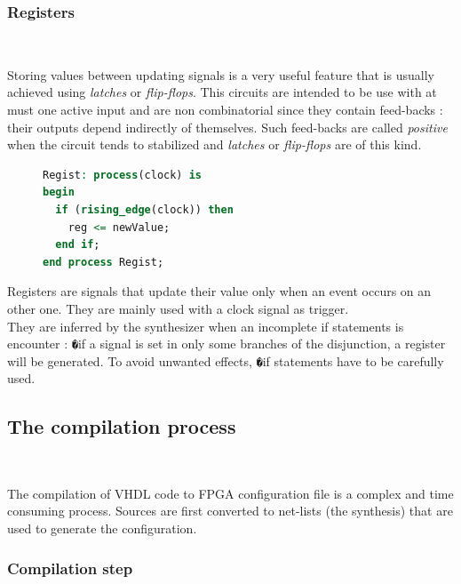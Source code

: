 \documentclass[10pt,a4paper]{article}
\newcommand{\code}{\texttt}
\renewcommand{\indent}{~\\\vspace{-.8cm}}
\begin{document}
\subsubsection{Registers}\indent


Storing values between updating signals is a very useful feature that is usually achieved using \textit{latches} or \textit{flip-flops}. This circuits are intended to be use with at must one active input and are non combinatorial since they contain feed-backs : their outputs depend indirectly of themselves. Such feed-backs are called \textit{positive} when the circuit tends to stabilized and \textit{latches} or \textit{flip-flops} are of this kind. \\


\begin{figure}
	\vspace{-15pt}
\begin{lstlisting}[language=VHDL, frame=single, title=Register generation]
Regist: process(clock) is
begin
  if (rising_edge(clock)) then
    reg <= newValue;
  end if;
end process Regist;
\end{lstlisting}
\end{figure}

Registers are signals that update their value only when an event occurs on an other one. They are mainly used with a clock signal as trigger.\\

They are inferred by the synthesizer when an incomplete if statements is encounter : \code�{if} a signal is set in only some branches of the disjunction, a register will be generated. To avoid unwanted effects, \code�{if} statements have to be carefully used.





\subsection{The compilation process} \indent

The compilation of VHDL code to FPGA configuration file is a complex and time consuming process. Sources are first converted to net-lists (the synthesis) that are used to generate the configuration. 

\subsubsection{Compilation step} \indent
\end{document}

